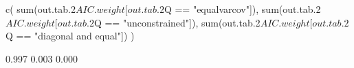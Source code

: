 \begin{Schunk}
\begin{Sinput}
 c(
   sum(out.tab.2$AIC.weight[out.tab.2$Q == "equalvarcov"]),
   sum(out.tab.2$AIC.weight[out.tab.2$Q == "unconstrained"]),
   sum(out.tab.2$AIC.weight[out.tab.2$Q == "diagonal and equal"])
 )
\end{Sinput}
\begin{Soutput}
[1] 0.997 0.003 0.000
\end{Soutput}
\end{Schunk}
